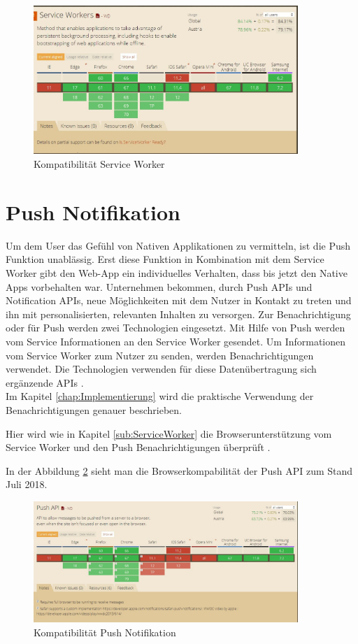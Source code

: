\begin{figure}[h]
	\centering
	\includegraphics[width=10cm]{BilderAllgemein/BrowserSW}\medskip
	\caption{Kompatibilität Service Worker \cite{BrowserSupport}}
	\label{fig:BrowserSW}
\end{figure}


\section{Push Notifikation}
Um dem User das Gefühl von Nativen Applikationen zu vermitteln, ist die Push Funktion unablässig. Erst diese Funktion in Kombination mit dem Service Worker gibt den \acl{Web-App} ein individuelles Verhalten, dass bis jetzt den Native Apps vorbehalten war.
Unternehmen bekommen, durch Push APIs und Notification APIs, neue Möglichkeiten mit dem Nutzer in Kontakt zu treten und ihn mit personalisierten, relevanten Inhalten zu versorgen.
Zur Benachrichtigung oder für Push werden zwei Technologien eingesetzt. Mit Hilfe von Push werden vom Service Informationen an den Service Worker gesendet. Um Informationen vom Service Worker zum Nutzer zu senden, werden Benachrichtigungen verwendet. Die Technologien verwenden für diese Datenübertragung sich ergänzende APIs \cite{PushNotifikation}. \\
Im Kapitel \ref{chap:Implementierung} wird die praktische Verwendung der Benachrichtigungen genauer beschrieben.  
 

Hier wird wie in Kapitel \ref{sub:ServiceWorker} die Browserunterstützung vom Service Worker und den Push Benachrichtigungen überprüft \cite{PushNotifikation}.


In der Abbildung \ref{fig:BrowserPushAPI} sieht man die Browserkompabilität der Push API zum Stand Juli 2018.
\begin{figure}[H]
	\centering
	\includegraphics[width=10cm]{BilderAllgemein/BrowserPushAPI}\medskip
	\caption{Kompatibilität Push Notifikation \cite{BrowserSupport}}
	\label{fig:BrowserPushAPI}
\end{figure}




